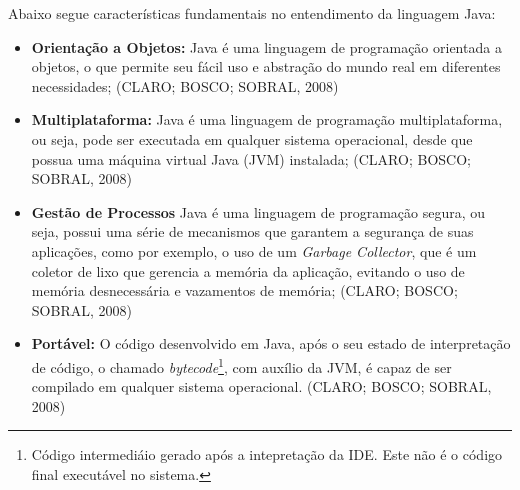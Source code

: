 \documentclass[a4paper,12pt]{article}
\begin{document}
Abaixo segue características fundamentais no entendimento da linguagem Java:
\begin{itemize}
	\item \textbf{Orientação a Objetos:} Java é uma linguagem de programação orientada a objetos, o que permite seu fácil uso e abstração do mundo real em diferentes necessidades; (CLARO; BOSCO; SOBRAL, 2008)
	\item \textbf{Multiplataforma:} Java é uma linguagem de programação multiplataforma, ou seja, pode ser executada em qualquer sistema operacional, desde que possua uma máquina virtual Java (JVM) instalada; (CLARO; BOSCO; SOBRAL, 2008)
	\item \textbf{Gestão de Processos} Java é uma linguagem de programação segura, ou seja, possui uma série de mecanismos que garantem a segurança de suas aplicações, como por exemplo, o uso de um \textit{Garbage Collector}, 
	que é um coletor de lixo que gerencia a memória da aplicação, evitando o uso de memória desnecessária e vazamentos de memória; (CLARO; BOSCO; SOBRAL, 2008)
	\item \textbf{Portável:} O código desenvolvido em Java, após o seu estado de interpretação de código, o chamado \textit{bytecode}\footnote{
		Código intermediáio gerado após a intepretação da IDE. Este não é o código final executável no sistema.
	}, com auxílio da JVM, é capaz de ser compilado em qualquer sistema operacional. (CLARO; BOSCO; SOBRAL, 2008)
\end{itemize}
\end{document}
